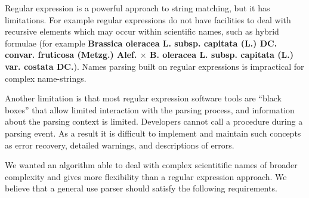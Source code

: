 \documentclass{bmcart}
\begin{document}
Regular expression is a powerful approach to string matching, but it
has limitations. For example regular expressions do not have
facilities to deal with recursive elements
\cite{yu1997handbook} which may occur within scientific names, such as hybrid formulae (for example
\textbf{Brassica oleracea L.  subsp.  capitata (L.) DC. convar. fruticosa
  (Metzg.) Alef.  $\times$ B. oleracea L. subsp. capitata (L.) var.  costata
DC.}). Names parsing built on regular
expressions is impractical for complex name-strings.

Another limitation is that most regular expression software tools are ``black boxes'' that allow limited interaction with the parsing process, and information
about the parsing context is limited. Developers cannot call a procedure during a
parsing event. As a result it is difficult to implement and maintain such
concepts as error recovery, detailed warnings, and descriptions of errors.

We wanted an algorithm  able to deal with complex scientitific names of broader
complexity and gives more flexibility than a regular expression approach.  We believe that a general use parser should satisfy the following requirements.
\end{document}
